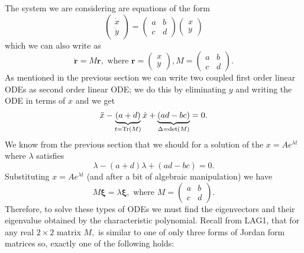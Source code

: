 \documentclass[12pt, a4paper]{article}
\theoremstyle{definition}
\theoremstyle{plain}
\begin{document}
The system we are considering are equations of the form $$\begin{pmatrix} \dot{x} \\ \dot{y} \end{pmatrix} = \begin{pmatrix} a&b \\ c&d \end{pmatrix} \begin{pmatrix} x\\y \end{pmatrix}$$ which we can also write as $$\dot{\bm{r}}=M\bm{r}, \text{ where } \bm{r}=\begin{pmatrix} x\\y \end{pmatrix}, M=\begin{pmatrix} a&b \\ c&d \end{pmatrix}.$$ As mentioned in the previous section we can write two coupled first order linear ODEs as second order linear ODE; we do this by eliminating $y$ and writing the ODE in terms of $x$ and we get $$\ddot{x}-\underbrace{(a+d)}_{t=\Trace(M)}\dot{x}+\underbrace{(ad-bc)}_{\Delta=\det(M)}=0.$$ We know from the previous section that we should for a solution of the $x=Ae^{\lambda t}$ where $\lambda$ satisfies $$\lambda-(a+d)\lambda+(ad-bc)=0.$$ Substituting $x=Ae^{\lambda t}$ (and after a bit of algebraic manipulation) we have $$M\bm{\xi}=\lambda\bm{\xi}, \text{ where } M= \begin{pmatrix} a&b \\ c&d \end{pmatrix}.$$ Therefore, to solve these types of ODEs we must find the eigenvectors and their eigenvalue obtained by the characteristic polynomial. Recall from LAG1, that for any real $2\times 2$ matrix $M,$ is similar to one of only three forms of Jordan form matrices so, exactly one of the following holds:
\end{document}
